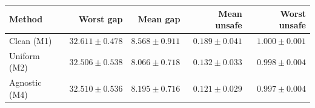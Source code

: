 \begin{tabular}{@{}lrrrr@{}}\toprule
Method & Worst gap & Mean gap & Mean unsafe & Worst unsafe\\\midrule
Clean (M1) & $32.611\pm0.478$ & $8.568\pm0.911$ & $0.189\pm0.041$ & $1.000\pm0.001$\\
Uniform (M2) & $32.506\pm0.538$ & $8.066\pm0.718$ & $0.132\pm0.033$ & $0.998\pm0.004$\\
Agnostic (M4) & $32.510\pm0.536$ & $8.195\pm0.716$ & $0.121\pm0.029$ & $0.997\pm0.004$\\
\bottomrule\end{tabular}
